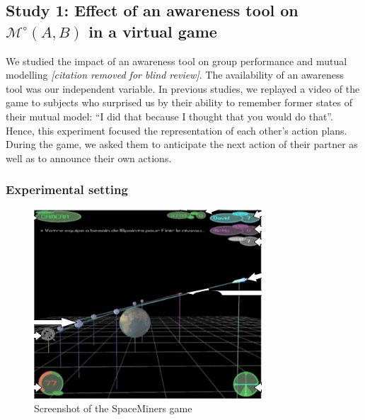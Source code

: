 \documentclass[natbib]{svjour3}
\newcommand{\gModel}[2]{{$\mathcal{M}^{\circ}(#1, #2)$}}
\begin{document}
\subsection{{\bf Study 1}: Effect of an awareness tool on \gModel{A}{B} in a virtual
game}

We studied the impact of an awareness tool on group performance and mutual
modelling \textit{[citation removed for blind review]}. The availability
of an awareness tool was our independent variable. In previous studies, we
replayed a video of the game to subjects who surprised us by their ability to
remember former states of their mutual model: ``I did that because I thought that
you would do that''. Hence, this experiment focused the representation of each
other's action plans. During the game, we asked them to anticipate the next
action of their partner as well as to announce their own actions.

\subsubsection*{Experimental setting}

\begin{figure}
        \centering
        \includegraphics[width=\textwidth]{image4.png}
        \caption{Screenshot of the {\sc SpaceMiners} game}
        \label{study1:spaceminer}
\end{figure}
\end{document}
